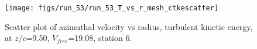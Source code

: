 \begin{figure}[H]
\centering
\texttt{[image: figs/run\_53/run\_53\_T\_vs\_r\_mesh\_ctkescatter]}
\caption{Scatter plot of azimuthal velocity vs radius, turbulent kinetic energy, at $z/c$=9.50, $V_{free}$=19.08, station 6.}
\end{figure}


